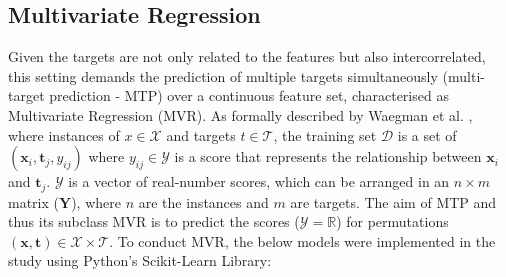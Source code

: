 \documentclass[conference]{IEEEtran}
\begin{document}
\subsection{Multivariate Regression}\label{Models}
Given the targets are not only related to the features but also intercorrelated, this setting demands the prediction of multiple targets simultaneously (multi-target prediction - MTP) over a continuous feature set, characterised as Multivariate Regression (MVR). As formally described by Waegman et al. \cite{waegeman2018multitargetpredictionunifyingview}, where instances of $x \in \mathcal{X}$ and targets $t \in \mathcal{T}$, the training set $\mathcal{D}$ is a set of $(\mathbf{x}_i, \mathbf{t}_j, y_{ij})$ where $y_{ij} \in \mathcal{Y}$ is a score that represents the relationship between $\mathbf{x}_i$ and $\mathbf{t}_j$. $\mathcal{Y}$ is a vector of real-number scores, which can be arranged in an $n \times m$ matrix ($\mathbf{Y}$), where $n$ are the instances and $m$ are targets. The aim of MTP and thus its subclass MVR is to predict the scores ($\mathcal{Y} = \mathbb{R}$) for permutations $(\mathbf{x}, \mathbf{t}) \in \mathcal{X} \times \mathcal{T}$. To conduct MVR, the below models were implemented in the study using Python's Scikit-Learn Library:
\end{document}
